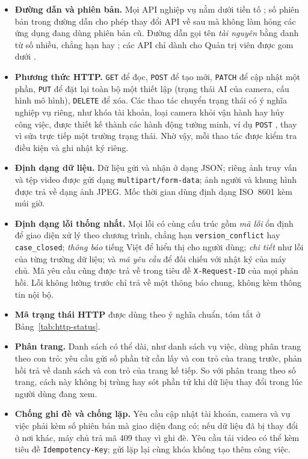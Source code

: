 \begin{itemize}
    \item \textbf{Đường dẫn và phiên bản.} Mọi API nghiệp vụ nằm dưới tiền tố ; số phiên bản trong đường dẫn cho phép thay đổi API về sau mà không làm hỏng các ứng dụng đang dùng phiên bản cũ. Đường dẫn gọi tên \emph{tài nguyên} bằng danh từ số nhiều, chẳng hạn  hay ; các API chỉ dành cho Quản trị viên được gom dưới .
    \item \textbf{Phương thức HTTP.} \texttt{GET} để đọc, \texttt{POST} để tạo mới, \texttt{PATCH} để cập nhật một phần, \texttt{PUT} để đặt lại toàn bộ một thiết lập (trạng thái AI của camera, cấu hình mô hình), \texttt{DELETE} để xóa. Các thao tác chuyển trạng thái có ý nghĩa nghiệp vụ riêng, như khóa tài khoản, loại camera khỏi vận hành hay hủy công việc, được thiết kế thành các hành động tường minh, ví dụ \texttt{POST} , thay vì sửa trực tiếp một trường trạng thái. Nhờ vậy, mỗi thao tác được kiểm tra điều kiện và ghi nhật ký riêng.
    \item \textbf{Định dạng dữ liệu.} Dữ liệu gửi và nhận ở dạng JSON; riêng ảnh truy vấn và tệp video được gửi dạng \texttt{multipart/form-data}; ảnh người và khung hình được trả về dạng ảnh JPEG. Mốc thời gian dùng định dạng ISO~8601 kèm múi giờ.
    \item \textbf{Định dạng lỗi thống nhất.} Mọi lỗi có cùng cấu trúc gồm \emph{mã lỗi} ổn định để giao diện xử lý theo chương trình, chẳng hạn \texttt{version\_conflict} hay \texttt{case\_closed}; \emph{thông báo} tiếng Việt để hiển thị cho người dùng; \emph{chi tiết} như lỗi của từng trường dữ liệu; và \emph{mã yêu cầu} để đối chiếu với nhật ký của máy chủ. Mã yêu cầu cũng được trả về trong tiêu đề \texttt{X-Request-ID} của mọi phản hồi. Lỗi không lường trước chỉ trả về một thông báo chung, không kèm thông tin nội bộ.
    \item \textbf{Mã trạng thái HTTP} được dùng theo ý nghĩa chuẩn, tóm tắt ở Bảng~\ref{tab:http-status}.
    \item \textbf{Phân trang.} Danh sách có thể dài, như danh sách vụ việc, dùng phân trang theo con trỏ: yêu cầu gửi số phần tử cần lấy và con trỏ của trang trước, phản hồi trả về danh sách và con trỏ của trang kế tiếp. So với phân trang theo số trang, cách này không bị trùng hay sót phần tử khi dữ liệu thay đổi trong lúc người dùng đang xem.
    \item \textbf{Chống ghi đè và chống lặp.} Yêu cầu cập nhật tài khoản, camera và vụ việc phải kèm số phiên bản mà giao diện đang có; nếu dữ liệu đã bị thay đổi ở nơi khác, máy chủ trả mã 409 thay vì ghi đè. Yêu cầu tải video có thể kèm tiêu đề \texttt{Idempotency-Key}; gửi lặp lại cùng khóa không tạo thêm công việc.
\end{itemize}

